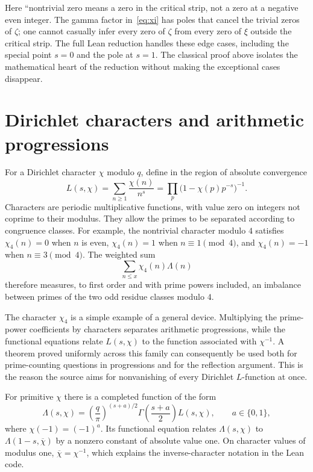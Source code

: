 \documentclass[11pt,openany,oneside]{scrbook}
\theoremstyle{definition}
\theoremstyle{remark}
\begin{document}
Here ``nontrivial zero means a zero in the critical strip, not a zero at a negative even integer. The gamma factor in~\eqref{eq:xi} has poles that cancel the trivial zeros of $\zeta$; one cannot casually infer every zero of $\zeta$ from every zero of $\xi$ outside the critical strip. The full Lean reduction handles these edge cases, including the special point $s=0$ and the pole at $s=1$. The classical proof above isolates the mathematical heart of the reduction without making the exceptional cases disappear.

\section{Dirichlet characters and arithmetic progressions}
For a Dirichlet character $\chi$ modulo $q$, define in the region of absolute convergence
\[
L(s,\chi)=\sum_{n\ge1}\frac{\chi(n)}{n^s}=
\prod_p\bigl(1-\chi(p)p^{-s}\bigr)^{-1}.
\]
Characters are periodic multiplicative functions, with value zero on integers not coprime to their modulus. They allow the primes to be separated according to congruence classes. For example, the nontrivial character modulo $4$ satisfies $\chi_4(n)=0$ when $n$ is even, $\chi_4(n)=1$ when $n\equiv1\pmod4$, and $\chi_4(n)=-1$ when $n\equiv3\pmod4$. The weighted sum
\[
\sum_{n\le x}\chi_4(n)\Lambda(n)
\]
therefore measures, to first order and with prime powers included, an imbalance between primes of the two odd residue classes modulo $4$.

The character $\chi_4$ is a simple example of a general device. Multiplying the prime-power coefficients by characters separates arithmetic progressions, while the functional equations relate $L(s,\chi)$ to the function associated with $\chi^{-1}$. A theorem proved uniformly across this family can consequently be used both for prime-counting questions in progressions and for the reflection argument. This is the reason the source aims for nonvanishing of every Dirichlet $L$-function at once.

For primitive $\chi$ there is a completed function of the form
\begin{equation}\label{eq:completedL}
\Lambda(s,\chi)=\left(\frac{q}{\pi}\right)^{(s+a)/2}
\Gamma\!\left(\frac{s+a}{2}\right)L(s,\chi),
\qquad a\in\{0,1\},
\end{equation}
where $\chi(-1)=(-1)^a$. Its functional equation relates $\Lambda(s,\chi)$ to $\Lambda(1-s,\overline\chi)$ by a nonzero constant of absolute value one. On character values of modulus one, $\overline\chi=\chi^{-1}$, which explains the inverse-character notation in the Lean code.
\end{document}
